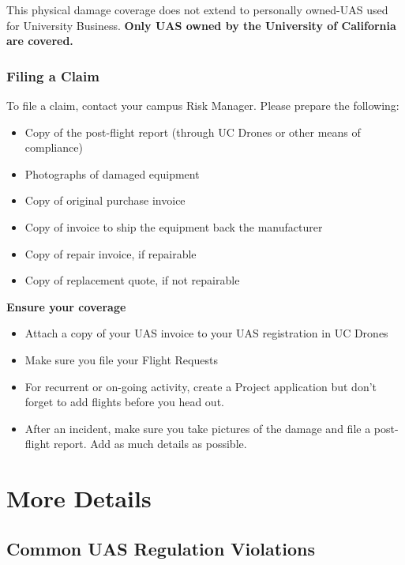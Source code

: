 \documentclass[
]{book}
\providecommand{\tightlist}{%
  \setlength{\itemsep}{0pt}\setlength{\parskip}{0pt}}
\begin{document}
This physical damage coverage does not extend to personally owned-UAS used for University Business. \textbf{Only UAS owned by the University of California are covered.}

\hypertarget{filing-a-claim}{%
\section{Filing a Claim}\label{filing-a-claim}}

To file a claim, contact your campus Risk Manager. Please prepare the following:

\begin{itemize}
\tightlist
\item
  Copy of the post-flight report (through UC Drones or other means of compliance)
\item
  Photographs of damaged equipment
\item
  Copy of original purchase invoice
\item
  Copy of invoice to ship the equipment back the manufacturer
\item
  Copy of repair invoice, if repairable
\item
  Copy of replacement quote, if not repairable
\end{itemize}

\textbf{Ensure your coverage}

\begin{itemize}
\tightlist
\item
  Attach a copy of your UAS invoice to your UAS registration in UC Drones
\item
  Make sure you file your Flight Requests
\item
  For recurrent or on-going activity, create a Project application but don't forget to add flights before you head out.
\item
  After an incident, make sure you take pictures of the damage and file a post-flight report. Add as much details as possible.
\end{itemize}

\hypertarget{part-more-details}{%
\part{More Details}\label{part-more-details}}

\hypertarget{ch-common-UAS-violations}{%
\chapter{Common UAS Regulation Violations}\label{ch-common-UAS-violations}}
\end{document}
